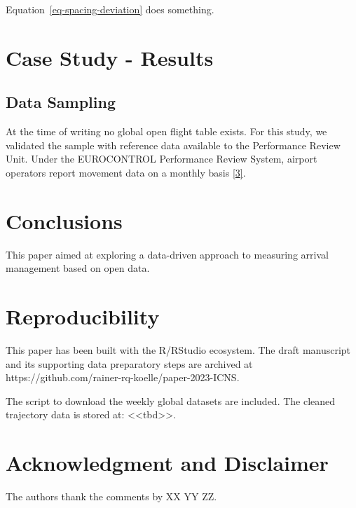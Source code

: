 \documentclass[letterpaper, 10 pt, journal, twoside]{IEEEtran}
\begin{document}
Equation~\ref{eq-spacing-deviation} does something.

\hypertarget{case-study---results}{%
\section{Case Study - Results}\label{case-study---results}}

\hypertarget{data-sampling}{%
\subsection{Data Sampling}\label{data-sampling}}

At the time of writing no global open flight table exists. For this
study, we validated the sample with reference data available to the
Performance Review Unit. Under the EUROCONTROL Performance Review
System, airport operators report movement data on a monthly basis
\protect\hyperlink{ref-apdf_v1_2019}{{[}3{]}}.

\hypertarget{conclusions}{%
\section{Conclusions}\label{conclusions}}

This paper aimed at exploring a data-driven approach to measuring
arrival management based on open data.

\hypertarget{reproducibility}{%
\section*{Reproducibility}\label{reproducibility}}

This paper has been built with the R/RStudio ecosystem. The draft
manuscript and its supporting data preparatory steps are archived at
https://github.com/rainer-rq-koelle/paper-2023-ICNS.

The script to download the weekly global datasets are included. The
cleaned trajectory data is stored at:
\textless\textless tbd\textgreater\textgreater.

\hypertarget{acknowledgment-and-disclaimer}{%
\section*{Acknowledgment and
Disclaimer}\label{acknowledgment-and-disclaimer}}

The authors thank the comments by XX YY ZZ.
\end{document}
